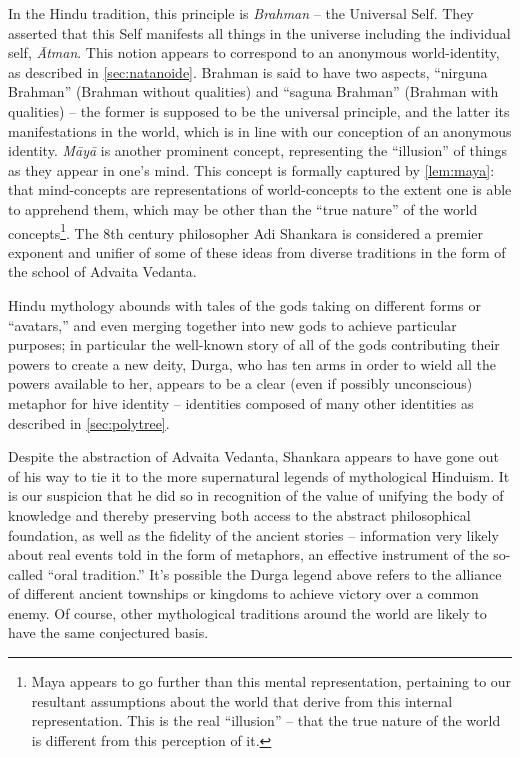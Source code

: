 \documentclass[pra,twocolumn,groupedaddress,10pt]{revtex4}
\theoremstyle{definition}
\begin{document}
In the Hindu tradition, this principle is \textit{Brahman} -- the Universal Self. They asserted that this Self manifests all things in the universe including the individual self, \textit{\={A}tman}. This notion appears to correspond to an anonymous world-identity, as described in \autoref{sec:natanoide}. Brahman is said to have two aspects, ``nirguna Brahman'' (Brahman without qualities) and ``saguna Brahman'' (Brahman with qualities) -- the former is supposed to be the universal principle, and the latter its manifestations in the world, which is in line with our conception of an anonymous identity. \textit{M\={a}y\={a}} is another prominent concept, representing the ``illusion'' of things as they appear in one's mind. This concept is formally captured by \autoref{lem:maya}: that mind-concepts are representations of world-concepts to the extent one is able to apprehend them, which may be other than the ``true nature'' of the world concepts\footnote{Maya appears to go further than this mental representation, pertaining to our resultant assumptions about the world that derive from this internal representation. This is the real ``illusion'' -- that the true nature of the world is different from this perception of it.}. The 8th century philosopher Adi Shankara\cite{shankara} is considered a premier exponent and unifier of some of these ideas from diverse traditions in the form of the school of Advaita Vedanta. %

Hindu mythology abounds with tales of the gods taking on different forms or ``avatars,'' and even merging together into new gods to achieve particular purposes; in particular the well-known story of all of the gods contributing their powers to create a new deity, Durga, who has ten arms in order to wield all the powers available to her, appears to be a clear (even if possibly unconscious) metaphor for hive identity -- identities composed of many other identities as described in \autoref{sec:polytree}.

Despite the abstraction of Advaita Vedanta, Shankara appears to have gone out of his way to tie it to the more supernatural legends of mythological Hinduism. It is our suspicion that he did so in recognition of the value of unifying the body of knowledge and thereby preserving both access to the abstract philosophical foundation, as well as the fidelity of the ancient stories -- information very likely about real events told in the form of metaphors, an effective instrument of the so-called ``oral tradition.'' It's possible the Durga legend above refers to the alliance of different ancient townships or kingdoms to achieve victory over a common enemy. Of course, other mythological traditions around the world are likely to have the same conjectured basis.
\end{document}
